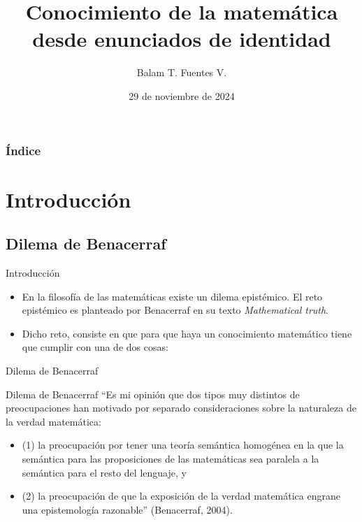 \documentclass{beamer}
\title[Introducción]{Conocimiento de la matem\'atica desde enunciados de 
identidad}
\author[Balam T. Fuentes Villianueva]
{Balam T. Fuentes V.}
\institute[Universidad Nacional Autónoma de México]
{
  
  Facultad de Filosofía y Letras, UNAM.
  \and
  \texttt{bllvllnv@gmail.com}
}
\date{29 de noviembre de 2024}
\begin{document}
\frame{\titlepage}
\begin{frame}
  \frametitle{Índice}
  \tableofcontents
\end{frame}
\section{Introducci\'on}
    \subsection{Dilema de Benacerraf}
        \begin{frame}{Introducci\'on}
            \begin{itemize}
                \item[] En la filosofía de las matemáticas existe un dilema 
                epist\'emico. El reto epist\'emico es planteado por 
                Benacerraf en su texto \textit{Mathematical truth}. \pause

                \item[] Dicho reto, consiste en que para que haya un 
                conocimiento matemático tiene que cumplir con una 
                de dos cosas:
            \end{itemize}      
        \end{frame}
        \begin{frame}{Dilema de Benacerraf}
            \begin{block}{Dilema de Benacerraf}
                \noindent \small ``Es mi opinión que dos tipos muy distintos de 
                preocupaciones han motivado por separado consideraciones sobre 
                la naturaleza de la verdad matemática: 
                \begin{itemize}
                    \item (1) la preocupación por 
                    tener una teoría semántica homogénea en la que la semántica 
                    para las proposiciones de las matemáticas sea paralela a 
                    la semántica para el resto del lenguaje, y \pause
                    \item (2) la preocupación de que la exposición de la verdad 
                    matemática engrane una epistemología 
                    razonable'' (Benacerraf, 2004).
                \end{itemize} 
            \end{block}
        \end{frame}
\end{document}
